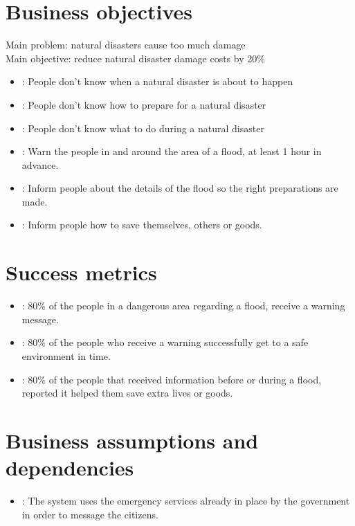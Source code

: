 
\section{Business objectives}
Main problem: natural disasters cause too much damage\\
Main objective: reduce natural disaster damage costs by 20\%

\begin{itemize}
	\item {}: People don't know when a natural disaster is about to happen
	\item {}: People don't know how to prepare for a natural disaster
	\item {}: People don't know what to do during a natural disaster
\end{itemize}

\begin{itemize}
	\item {}: Warn the people in and around the area of a flood, at least 1 hour in advance.
	\item {}: Inform people about the details of the flood so the right preparations are made. 
	\item {}: Inform people how to save themselves, others or goods.
\end{itemize}

\section{Success metrics}
\begin{itemize}
	\item {}: 80\% of the people in a dangerous area regarding a flood,  receive a warning message.
	\item {}: 80\% of the people who receive a warning successfully get to a safe environment in time.
	\item {}: 80\% of the people that received information before or during a flood, reported it helped them save extra lives or goods.
\end{itemize}




\section{Business assumptions and dependencies}
\begin{itemize}
	\item {}: The system uses the emergency services already in place by the government in order to message the citizens.
	
\end{itemize}

